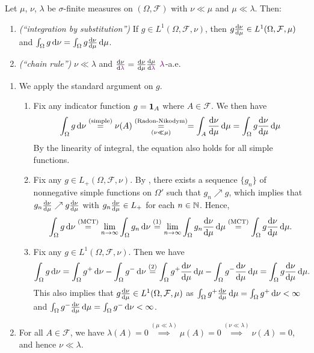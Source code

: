 \begin{enumerate}
Let \(\mu\), \(\nu\), \(\lambda\) be \(\sigma\)-finite measures on
\((\Omega,\mathcal{F})\) with \(\nu\ll\mu\) and \(\mu\ll\lambda\). Then:
\begin{enumerate}
\item\label{it:rn-deriv-int-sub} \emph{(``integration by substitution'')} If \(g\in
L^{1}(\Omega,\mathcal{F},\nu)\), then \(g\odv{\nu}{\mu}\in
L^{1}(\Omega,\mathcal{F},\mu)\) and
\(\int_{\Omega}^{}g\odif{\nu}=\int_{\Omega}^{}g\odv{\nu}{\mu}\odif{\mu}\).
\item\label{it:rn-deriv-chain-rule} \emph{(``chain rule'')} \(\nu\ll\lambda\) and
\(\odv{\nu}{\vc{\lambda}}=\odv{\nu}{\mu}\odv{\mu}{\vc{\lambda}}\) \(\vc{\lambda}\)-a.e.
\end{enumerate}
\begin{pf}
\begin{enumerate}
\item We apply the standard argument on \(g\).
\begin{enumerate}[label={(\arabic*)}]
\item Fix any indicator function \(g=\mathbf{1}_{A}\) where \(A\in\mathcal{F}\). We
then have
\[
\int_{\Omega}^{}g\odif{\nu}\overset{\text{(simple)}}{=}\nu(A)\underset{(\nu\ll\mu)}{\overset{\text{(Radon-Nikodym)}}{=}}
=\int_{A}^{}\odv{\nu}{\mu}\odif{\mu} =\int_{\Omega}^{}g\odv{\nu}{\mu}\odif{\mu}
\]
By the linearity of integral, the equation also holds for all simple functions.
\item Fix any \(g\in L_{+}(\Omega,\mathcal{F},\nu)\). By , there exists a sequence
\(\{g_n\}\) of nonnegative simple functions on \(\Omega'\) such that
\(g_n\nearrow g\), which implies that \(g_n\odv{\nu}{\mu}\nearrow g\odv{\nu}{\mu}\)
with \(g_n\odv{\nu}{\mu}\in L_{+}\) for each \(n\in\mathbb{N}\). Hence,
\[
\int_{\Omega}^{}g\odif{\nu}\overset{\text{(MCT)}}{=}
\lim_{n\to\infty}\int_{\Omega}^{}g_n\odif{\nu}
\overset{(1)}{=}\lim_{n\to\infty}\int_{\Omega}^{}g_n\odv{\nu}{\mu}\odif{\mu}
\overset{\text{(MCT)}}{=}\int_{\Omega}^{}g\odv{\nu}{\mu}\odif{\mu}.
\]
\item Fix any \(g\in L^{1}(\Omega,\mathcal{F},\nu)\). Then we have
\[
\int_{\Omega}^{}g\odif{\nu}=\int_{\Omega}^{}g^{+}\odif{\nu}-\int_{\Omega}^{}g^{-}\odif{\nu}
\overset{(2)}{=}\int_{\Omega}^{}g^{+}\odv{\nu}{\mu}\odif{\mu}
-\int_{\Omega}^{}g^{-}\odv{\nu}{\mu}\odif{\mu}
=\int_{\Omega}^{}g\odv{\nu}{\mu}\odif{\mu}.
\]
This also implies that \(g\odv{\nu}{\mu}\in L^{1}(\Omega,\mathcal{F},\mu)\) as
\(\int_{\Omega}^{}g^{+}\odv{\nu}{\mu}\odif{\mu}=\int_{\Omega}^{}g^{+}\odif{\nu}<\infty\)
and \(\int_{\Omega}^{}g^{-}\odv{\nu}{\mu}\odif{\mu}=\int_{\Omega}^{}g^{-}\odif{\nu}<\infty\).
\end{enumerate}
\item For all \(A\in\mathcal{F}\), we have
\(\lambda(A)=0\overset{(\mu\ll\lambda)}{\implies }\mu(A)=0
\overset{(\nu\ll\lambda)}{\implies }\nu(A)=0\), and hence \(\nu\ll\lambda\).


\end{enumerate}
\end{pf}
\end{enumerate}
